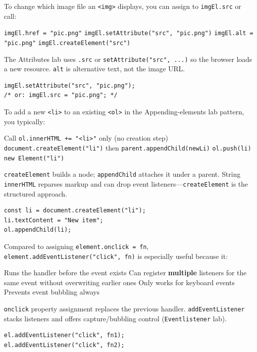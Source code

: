 \newpage
{}

\question[4]
To change which image file an \texttt{<img>} displays, you can assign to \texttt{imgEl.src} or call:
\begin{choices}
  \choice \texttt{imgEl.href = "pic.png"}
  \CorrectChoice \texttt{imgEl.setAttribute("src", "pic.png")}
  \choice \texttt{imgEl.alt = "pic.png"}
  \choice \texttt{imgEl.createElement("src")}
\end{choices}
\begin{solution}
  The Attributes lab uses \texttt{.src} or \texttt{setAttribute("src", ...)} so the browser loads a new resource. \texttt{alt} is alternative text, not the image URL.
\begin{lstlisting}[style=jsexam]
imgEl.setAttribute("src", "pic.png");
/* or: imgEl.src = "pic.png"; */
\end{lstlisting}
\end{solution}

\question[4]
To add a new \texttt{<li>} to an existing \texttt{<ol>} in the Appending-elements lab pattern, you typically:
\begin{choices}
  \choice Call \texttt{ol.innerHTML += "<li>"} only (no creation step)
  \CorrectChoice \texttt{document.createElement("li")} then \texttt{parent.appendChild(newLi)}
  \choice \texttt{ol.push(li)}
  \choice \texttt{new Element("li")}
\end{choices}
\begin{solution}
  \texttt{createElement} builds a node; \texttt{appendChild} attaches it under a parent. String \texttt{innerHTML} reparses markup and can drop event listeners---\texttt{createElement} is the structured approach.
\begin{lstlisting}[style=jsexam]
const li = document.createElement("li");
li.textContent = "New item";
ol.appendChild(li);
\end{lstlisting}
\end{solution}

\question[4]
Compared to assigning \texttt{element.onclick = fn}, \texttt{element.addEventListener("click", fn)} is especially useful because it:
\begin{choices}
  \choice Runs the handler before the event exists
  \CorrectChoice Can register \textbf{multiple} listeners for the same event without overwriting earlier ones
  \choice Only works for keyboard events
  \choice Prevents event bubbling always
\end{choices}
\begin{solution}
  \texttt{onclick} property assignment replaces the previous handler. \texttt{addEventListener} stacks listeners and offers capture/bubbling control (\texttt{Eventlistener} lab).
\begin{lstlisting}[style=jsexam]
el.addEventListener("click", fn1);
el.addEventListener("click", fn2);
\end{lstlisting}
\end{solution}

